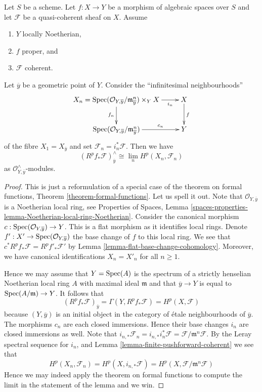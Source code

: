 \begin{lemma}
\label{lemma-formal-functions-stalk}
Let $S$ be a scheme. Let $f : X \to Y$ be a morphism of algebraic spaces
over $S$ and let $\mathcal{F}$ be a quasi-coherent sheaf on $X$. Assume
\begin{enumerate}
\item $Y$ locally Noetherian,
\item $f$ proper, and
\item $\mathcal{F}$ coherent.
\end{enumerate}
Let $\overline{y}$ be a geometric point of $Y$.
Consider the ``infinitesimal neighbourhoods''
$$
\xymatrix{
X_n =
\Spec(\mathcal{O}_{Y, \overline{y}}/\mathfrak m_{\overline{y}}^n) \times_Y X
\ar[r]_-{i_n} \ar[d]_{f_n} &
X \ar[d]^f \\
\Spec(\mathcal{O}_{Y, \overline{y}}/\mathfrak m_{\overline{y}}^n)
\ar[r]^-{c_n} & Y
}
$$
of the fibre $X_1 = X_{\overline{y}}$ and set
$\mathcal{F}_n = i_n^*\mathcal{F}$. Then we have
$$
\left(R^pf_*\mathcal{F}\right)_{\overline{y}}^\wedge
\cong
\lim_n H^p(X_n, \mathcal{F}_n)
$$
as $\mathcal{O}_{Y, \overline{y}}^\wedge$-modules.
\end{lemma}

\begin{proof}
This is just a reformulation of a special case of the theorem
on formal functions, Theorem \ref{theorem-formal-functions}.
Let us spell it out. Note that $\mathcal{O}_{Y, \overline{y}}$
is a Noetherian local ring, see
Properties of Spaces, Lemma
\ref{spaces-properties-lemma-Noetherian-local-ring-Noetherian}.
Consider the canonical morphism
$c : \mathop{\mathrm{Spec}}(\mathcal{O}_{Y, \overline{y}}) \to Y$.
This is a flat morphism as it identifies local rings.
Denote $f' : X' \to \mathop{\mathrm{Spec}}(\mathcal{O}_{Y, \overline{y}})$
the base change of $f$ to this local ring. We see that
$c^*R^pf_*\mathcal{F} = R^pf'_*\mathcal{F}'$ by
Lemma \ref{lemma-flat-base-change-cohomology}.
Moreover, we have canonical identifications $X_n = X'_n$
for all $n \geq 1$.

\medskip\noindent
Hence we may assume that $Y = \mathop{\mathrm{Spec}}(A)$ is the spectrum of
a strictly henselian Noetherian local ring $A$ with maximal ideal
$\mathfrak m$ and that $\overline{y} \to Y$ is equal to
$\mathop{\mathrm{Spec}}(A/\mathfrak m) \to Y$. It follows that
$$
\left(R^pf_*\mathcal{F}\right)_{\overline{y}} =
\Gamma(Y, R^pf_*\mathcal{F}) =
H^p(X, \mathcal{F})
$$
because $(Y, \overline{y})$ is an initial object in the category
of \'etale neighbourhoods of $\overline{y}$.
The morphisms $c_n$ are each closed immersions.
Hence their base changes $i_n$ are closed immersions as well.
Note that $i_{n, *}\mathcal{F}_n = i_{n, *}i_n^*\mathcal{F}
= \mathcal{F}/\mathfrak m^n\mathcal{F}$. By the Leray spectral sequence
for $i_n$, and Lemma \ref{lemma-finite-pushforward-coherent} we see that
$$
H^p(X_n, \mathcal{F}_n) =
H^p(X, i_{n, *}\mathcal{F}) =
H^p(X, \mathcal{F}/\mathfrak m^n\mathcal{F})
$$
Hence we may indeed apply the theorem on formal functions to compute
the limit in the statement of the lemma and we win.
\end{proof}

